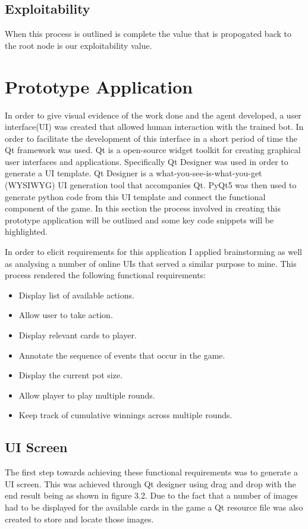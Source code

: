 \subsection{Exploitability}\label{subsec:exploitability}
When this process is outlined is complete the value that is propogated back to the
root node is our exploitability value.

\section{Prototype Application}\label{sec:prototypeApp}
In order to give visual evidence of the work done and the agent developed, a user interface(UI) was created
that allowed human interaction with the trained bot.
In order to facilitate the development of this interface in a short period of time the Qt framework was used.
Qt is a open-source widget toolkit for creating graphical user interfaces and applications.
Specifically Qt Designer was used in order to generate a UI template.
Qt Designer is a what-you-see-is-what-you-get (WYSIWYG) UI generation tool that accompanies Qt.
PyQt5 was then used to generate python code from this UI template and connect the functional component of the game.
In this section the process involved in creating this prototype application will be outlined
and some key code snippets will be highlighted.

In order to elicit requirements for this application I applied brainstorming as well as analysing a number
of online UIs that served a similar purpose to mine.
This process rendered the following functional requirements:
\begin{itemize}
    \item Display list of available actions.
    \item Allow user to take action.
    \item Display relevant cards to player.
    \item Annotate the sequence of events that occur in the game.
    \item Display the current pot size.
    \item Allow player to play multiple rounds.
    \item Keep track of cumulative winnings across multiple rounds.
\end{itemize}

\subsection{UI Screen}\label{subsec:UiScreen}
The first step towards achieving these functional requirements was to generate a UI screen.
This was achieved through Qt designer using drag and drop with the end result being as shown in figure 3.2.
Due to the fact that a number of images had to be displayed for the available cards in the
game a Qt resource file was also created to store and locate those images.

